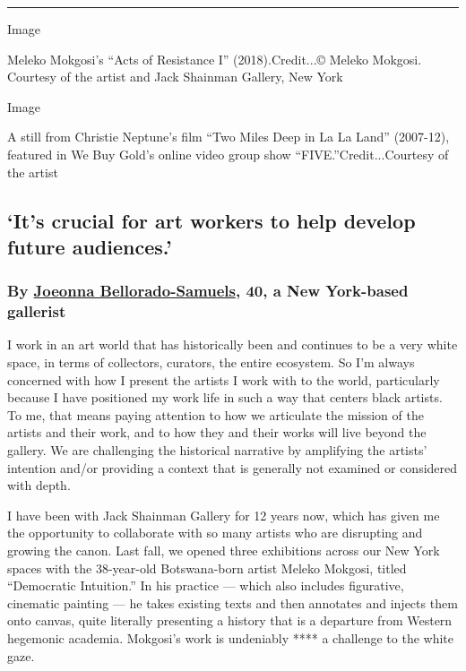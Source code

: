 \begin{center}\rule{0.5\linewidth}{\linethickness}\end{center}

Image

Meleko Mokgosi's ``Acts of Resistance I'' (2018).Credit...© Meleko
Mokgosi. Courtesy of the artist and Jack Shainman Gallery, New York

Image

A still from Christie Neptune's film ``Two Miles Deep in La La Land''
(2007-12), featured in We Buy Gold's online video group show
``FIVE.''Credit...Courtesy of the artist

\hypertarget{its-crucial-for-art-workers-to-help-develop-future-audiences}{%
\subsection{`It's crucial for art workers to help develop future
audiences.'}\label{its-crucial-for-art-workers-to-help-develop-future-audiences}}

\hypertarget{by-joeonna-bellorado-samuels-40-a-new-york-based-gallerist}{%
\subsubsection{\texorpdfstring{\textbf{By}
\textbf{\href{https://www.instagram.com/joeonna/?hl=en}{Joeonna
Bellorado-Samuels}, 40, a New York-based
gallerist}}{By Joeonna Bellorado-Samuels, 40, a New York-based gallerist}}\label{by-joeonna-bellorado-samuels-40-a-new-york-based-gallerist}}

I work in an art world that has historically been and continues to be a
very white space, in terms of collectors, curators, the entire
ecosystem. So I'm always concerned with how I present the artists I work
with to the world, particularly because I have positioned my work life
in such a way that centers black artists. To me, that means paying
attention to how we articulate the mission of the artists and their
work, and to how they and their works will live beyond the gallery. We
are challenging the historical narrative by amplifying the artists'
intention and/or providing a context that is generally not examined or
considered with depth.

I have been with Jack Shainman Gallery for 12 years now, which has given
me the opportunity to collaborate with so many artists who are
disrupting and growing the canon. Last fall, we opened three exhibitions
across our New York spaces with the 38-year-old Botswana-born artist
Meleko Mokgosi, titled ``Democratic Intuition.'' In his practice ---
which also includes figurative, cinematic painting --- he takes existing
texts and then annotates and injects them onto canvas, quite literally
presenting a history that is a departure from Western hegemonic
academia. Mokgosi's work is undeniably **** a challenge to the white
gaze.

